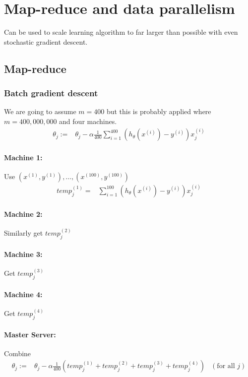 \section{Map-reduce and data parallelism}
Can be used to scale learning algorithm to far larger than possible with even
stochastic gradient descent.

\subsection{Map-reduce}
\subsubsection{Batch gradient descent}
We are going to assume $m = 400$ but this is probably applied where $m = 400,000,000$
and four machines.
\begin{align*}
	\theta_j :={} & \theta_j - \alpha \frac{1}{400} \sum_{i=1}^{400} \left(
	h_\theta(x^{(i)}) - y^{(i)}
	\right)x_j^{(i)}
\end{align*}

\paragraph{Machine 1:} Use $(x^{(1)}, y^{(1)}), \dots, (x^{(100)}, y^{(100)})$
\begin{align*}
	{temp}_j^{(1)} ={} & \sum_{i=1}^{100} \left(
	h_\theta(x^{(i)}) - y^{(i)}
	\right)x_j^{(i)}
\end{align*}
\paragraph{Machine 2:} Similarly get ${temp}_j^{(2)}$
\paragraph{Machine 3:} Get ${temp}_j^{(3)}$
\paragraph{Machine 4:} Get ${temp}_j^{(4)}$
\paragraph{Master Server:} Combine
\begin{align*}
	\theta_j :={} & \theta_j - \alpha\frac{1}{400}\left(
	temp_j^{(1)} + temp_j^{(2)} + temp_j^{(3)} + temp_j^{(4)}
	\right)       & (\text{for all } j)                  \\
\end{align*}

